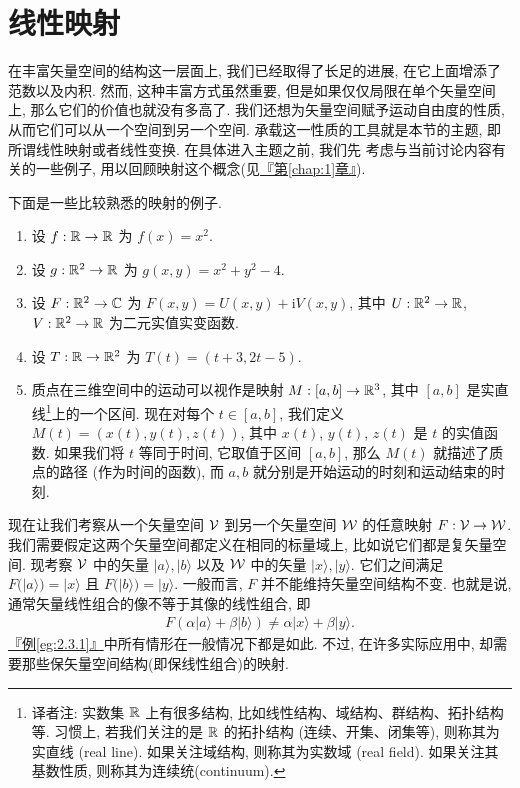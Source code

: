 \documentclass[lang=cn,zihao=-4,twoside,fontset=none]{textbook}
\def\eq#1{\[\begin{aligned}{}#1\end{aligned}\]}
\newcommand{\chapref}[1]{\hyperref[#1]{『第\textnormal{\ref*{#1}}章』}}
\newcommand{\egref}[1]{\hyperref[#1]{『例\textnormal{\ref*{#1}}』}}
\newcommand{\ii}{{\mathrm{i}}}
\renewcommand{\ket}[1]{| #1 \rangle}
\begin{document}
\newpage
\section{线性映射}\label{sec:2.3}

在丰富矢量空间的结构这一层面上, 我们已经取得了长足的进展, 在它上面增添了范数以及内积. 然而, 这种丰富方式虽然重要, 但是如果仅仅局限在单个矢量空间上, 那么它们的价值也就没有多高了. 我们还想为矢量空间赋予运动自由度的性质, 从而它们可以从一个空间到另一个空间. 承载这一性质的工具就是本节的主题, 即所谓线性映射或者线性变换. 在具体进入主题之前, 我们先
考虑与当前讨论内容有关的一些例子, 用以回顾映射这个概念(见\chapref{chap:1}). 

\begin{exam}
    \label{eg:2.3.1}%
    下面是一些比较熟悉的映射的例子.
    \begin{enumerate}
        \item 设 $f:{\mathbb R}\to{\mathbb R}$ 为 $f(x)=x^2$.
        \item 设 $g:{\mathbb R}^2\to{\mathbb R}$ 为 $g(x,y)=x^2+y^2-4$.
        \item 设 $F:{\mathbb R}^2\to{\mathbb C}$ 为 $F(x,y)=U(x,y)+\ii V(x,y)$, 其中 $U:{\mathbb R}^2\to{\mathbb R}$, $V:{\mathbb R}^2\to{\mathbb R}$ 为二元实值实变函数.
        \item 设 $T:{\mathbb R}\to{\mathbb R}^2$ 为 $T(t)=(t+3,2t-5)$.
        \item 质点在三维空间中的运动可以视作是映射 $M:[a,b]\to{\mathbb R}^3$, 其中 $[a,b]$ 是实直线\footnote{译者注: 实数集 ${\mathbb R}$ 上有很多结构, 比如线性结构、域结构、群结构、拓扑结构等. 习惯上, 若我们关注的是 ${\mathbb R}$ 的拓扑结构 (连续、开集、闭集等), 则称其为实直线 (real line). 如果关注域结构, 则称其为实数域 (real field). 如果关注其基数性质, 则称其为连续统(continuum).}上的一个区间. 现在对每个 $t\in[a,b]$, 我们定义 $M(t)=(x(t),y(t),z(t))$, 其中 $x(t)$, $y(t)$, $z(t)$ 是 $t$ 的实值函数. 如果我们将 $t$ 等同于时间, 它取值于区间 $[a,b]$, 那么 $M(t)$ 就描述了质点的路径 (作为时间的函数), 而 $a,b$ 就分别是开始运动的时刻和运动结束的时刻.
    \end{enumerate}
\end{exam}

现在让我们考察从一个矢量空间 ${\mathcal V}$ 到另一个矢量空间 ${\mathcal W}$ 的任意映射 $F:{\mathcal V}\to{\mathcal W}$. 我们需要假定这两个矢量空间都定义在相同的标量域上, 比如说它们都是复矢量空间. 现考察 ${\mathcal V}$ 中的矢量 $\ket{a},\ket{b}$ 以及 ${\mathcal W}$ 中的矢量 $\ket{x},\ket{y}$. 它们之间满足 $F(\ket{a})=\ket{x}$ 且 $F(\ket{b})=\ket{y}$. 一般而言, $F$ 并不能维持矢量空间结构不变. 也就是说, 通常矢量线性组合的像不等于其像的线性组合, 即 
\eq{
    F(\alpha\ket{a}+\beta\ket{b})\neq \alpha \ket{x} + \beta \ket{y}.
}
\egref{eg:2.3.1}中所有情形在一般情况下都是如此. 不过, 在许多实际应用中, 却需要那些保矢量空间结构(即保线性组合)的映射. 
\end{document}

